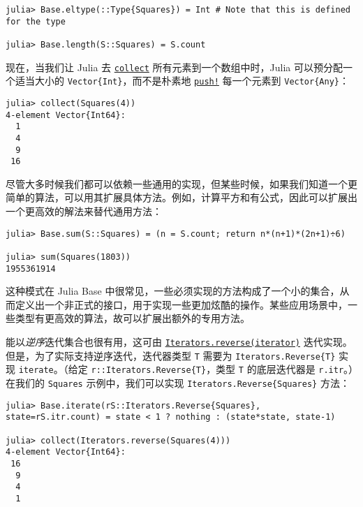 \begin{verbatim}
julia> Base.eltype(::Type{Squares}) = Int # Note that this is defined for the type

julia> Base.length(S::Squares) = S.count
\end{verbatim}



现在，当我们让 Julia 去 \hyperlink{6278865767444641812}{\texttt{collect}} 所有元素到一个数组中时，Julia 可以预分配一个适当大小的 \texttt{Vector\{Int\}}，而不是朴素地 \hyperlink{18026893834387542681}{\texttt{push!}} 每一个元素到 \texttt{Vector\{Any\}}：




\begin{verbatim}
julia> collect(Squares(4))
4-element Vector{Int64}:
  1
  4
  9
 16
\end{verbatim}



尽管大多时候我们都可以依赖一些通用的实现，但某些时候，如果我们知道一个更简单的算法，可以用其扩展具体方法。例如，计算平方和有公式，因此可以扩展出一个更高效的解法来替代通用方法：




\begin{verbatim}
julia> Base.sum(S::Squares) = (n = S.count; return n*(n+1)*(2n+1)÷6)

julia> sum(Squares(1803))
1955361914
\end{verbatim}



这种模式在 Julia Base 中很常见，一些必须实现的方法构成了一个小的集合，从而定义出一个非正式的接口，用于实现一些更加炫酷的操作。某些应用场景中，一些类型有更高效的算法，故可以扩展出额外的专用方法。



能以\emph{逆序}迭代集合也很有用，这可由 \hyperlink{12943296479800134710}{\texttt{Iterators.reverse(iterator)}} 迭代实现。但是，为了实际支持逆序迭代，迭代器类型 \texttt{T} 需要为 \texttt{Iterators.Reverse\{T\}} 实现 \texttt{iterate}。（给定 \texttt{r::Iterators.Reverse\{T\}}，类型 \texttt{T} 的底层迭代器是 \texttt{r.itr}。）在我们的 \texttt{Squares} 示例中，我们可以实现 \texttt{Iterators.Reverse\{Squares\}} 方法：




\begin{verbatim}
julia> Base.iterate(rS::Iterators.Reverse{Squares}, state=rS.itr.count) = state < 1 ? nothing : (state*state, state-1)

julia> collect(Iterators.reverse(Squares(4)))
4-element Vector{Int64}:
 16
  9
  4
  1
\end{verbatim}



